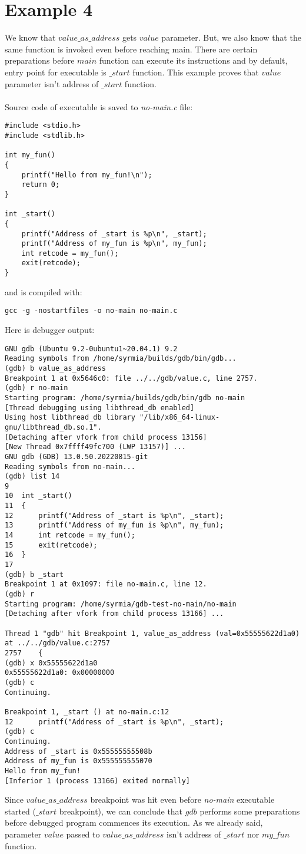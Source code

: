 \documentclass{report}
\begin{document}
\section *{Example 4}
We know that $value\_as\_address$ gets $value$ parameter. But, we also know that the same function is invoked even before reaching main. There are certain preparations before $main$ function can execute its instructions and by default, entry point for executable is $\_start$ function. This example proves that $value$ parameter isn't address of $\_start$ function.
\\ \\ 
Source code of executable is saved to \textit{no-main.c} file:
\begin{verbatim}
#include <stdio.h>
#include <stdlib.h>

int my_fun()
{
	printf("Hello from my_fun!\n");
	return 0;
}

int _start()
{
	printf("Address of _start is %p\n", _start);
	printf("Address of my_fun is %p\n", my_fun);
	int retcode = my_fun();
	exit(retcode);
}
\end{verbatim}
and is compiled with:
\begin{verbatim}
gcc -g -nostartfiles -o no-main no-main.c
\end{verbatim}
Here is debugger output:
\begin{verbatim}
GNU gdb (Ubuntu 9.2-0ubuntu1~20.04.1) 9.2
Reading symbols from /home/syrmia/builds/gdb/bin/gdb...
(gdb) b value_as_address
Breakpoint 1 at 0x5646c0: file ../../gdb/value.c, line 2757.
(gdb) r no-main
Starting program: /home/syrmia/builds/gdb/bin/gdb no-main
[Thread debugging using libthread_db enabled]
Using host libthread_db library "/lib/x86_64-linux-gnu/libthread_db.so.1".
[Detaching after vfork from child process 13156]
[New Thread 0x7ffff49fc700 (LWP 13157)] ...
GNU gdb (GDB) 13.0.50.20220815-git
Reading symbols from no-main...
(gdb) list 14
9	
10	int _start()
11	{
12		printf("Address of _start is %p\n", _start);
13		printf("Address of my_fun is %p\n", my_fun);
14		int retcode = my_fun();
15		exit(retcode);
16	}
17
(gdb) b _start
Breakpoint 1 at 0x1097: file no-main.c, line 12.
(gdb) r
Starting program: /home/syrmia/gdb-test-no-main/no-main 
[Detaching after vfork from child process 13166] ...

Thread 1 "gdb" hit Breakpoint 1, value_as_address (val=0x55555622d1a0) at ../../gdb/value.c:2757
2757	{
(gdb) x 0x55555622d1a0
0x55555622d1a0:	0x00000000
(gdb) c
Continuing.

Breakpoint 1, _start () at no-main.c:12
12		printf("Address of _start is %p\n", _start);
(gdb) c
Continuing.
Address of _start is 0x55555555508b
Address of my_fun is 0x555555555070
Hello from my_fun!
[Inferior 1 (process 13166) exited normally]
\end{verbatim}
Since $value\_as\_address$ breakpoint was hit even before \textit{no-main} executable started ($\_start$ breakpoint), we can conclude that $gdb$ performs some preparations before debugged program commences its execution. As we already said, parameter $value$ passed to $value\_as\_address$ isn't address of $\_start$ nor $my\_fun$ function.
\end{document}
